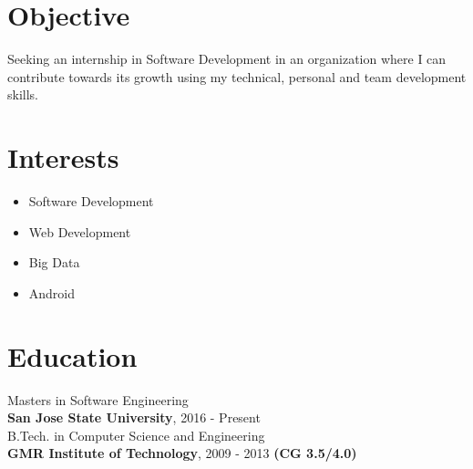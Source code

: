 \documentclass[margin]{res}
\begin{document}

\address{ \textbf{phone}:\hspace{1mm}\href{http://ankush.io/}{+1~(669)~400~9729}\hspace{5mm} \textbf{Github}:\hspace{1mm}\href{https://github.com/akshay-agarwal}{akshay-agarwal}\hspace{5mm}      \textbf{Email}:\hspace{1mm}\href{mailto:akshay.agwl@gmail.com}{akshay.agwl@gmail.com} }

\begin{resume}

\section{Objective}

  Seeking an internship in Software Development in an organization where I can contribute towards its growth using my technical, personal and team development skills.

\section{Interests}
 \begin{itemize} \itemsep -2pt  %
  \item Software Development 
 \item Web Development
 \item Big Data
 \item Android
 \end{itemize}
\section{Education}
  Masters in Software Engineering \\
  {\bf San Jose State University}, 2016 - Present \\  
  
  B.Tech. in Computer Science and Engineering \\
  {\bf GMR Institute of Technology}, 2009 - 2013 {\bf (CG 3.5/4.0) \\
  
}
\end{resume}
\end{document}
